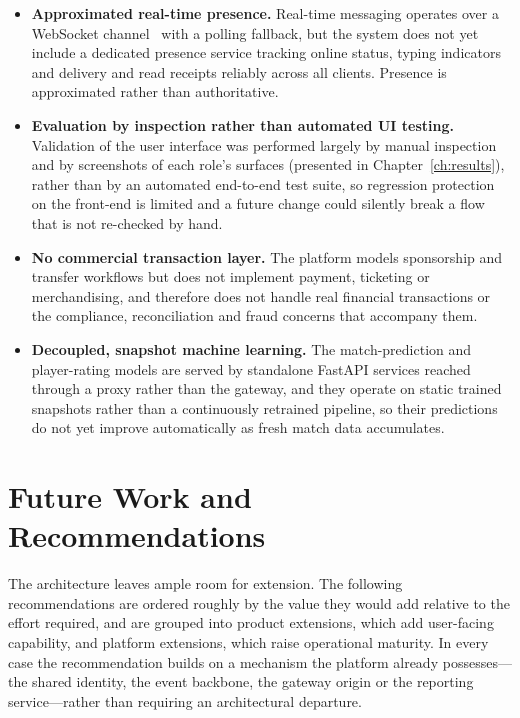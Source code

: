 \begin{itemize}
  \item \textbf{Approximated real-time presence.} Real-time messaging operates over a
        WebSocket channel~\cite{websocket} with a polling fallback, but the system does
        not yet include a dedicated presence service tracking online status, typing
        indicators and delivery and read receipts reliably across all clients. Presence is
        approximated rather than authoritative.

  \item \textbf{Evaluation by inspection rather than automated UI testing.} Validation
        of the user interface was performed largely by manual inspection and by
        screenshots of each role's surfaces (presented in Chapter~\ref{ch:results}),
        rather than by an automated end-to-end test suite, so regression protection on the
        front-end is limited and a future change could silently break a flow that is not
        re-checked by hand.

  \item \textbf{No commercial transaction layer.} The platform models sponsorship and
        transfer workflows but does not implement payment, ticketing or merchandising,
        and therefore does not handle real financial transactions or the compliance,
        reconciliation and fraud concerns that accompany them.

  \item \textbf{Decoupled, snapshot machine learning.} The match-prediction and
        player-rating models are served by standalone FastAPI services reached through a
        proxy rather than the gateway, and they operate on static trained snapshots rather
        than a continuously retrained pipeline, so their predictions do not yet improve
        automatically as fresh match data accumulates.
\end{itemize}

\section{Future Work and Recommendations}
\label{sec:future-work}

The architecture leaves ample room for extension. The following recommendations are
ordered roughly by the value they would add relative to the effort required, and are
grouped into product extensions, which add user-facing capability, and platform
extensions, which raise operational maturity. In every case the recommendation builds on a
mechanism the platform already possesses---the shared identity, the event backbone, the
gateway origin or the reporting service---rather than requiring an architectural departure.


